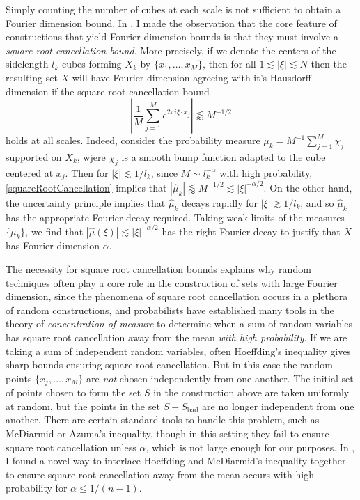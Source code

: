 \documentclass[11pt]{article}
\begin{document}
Simply counting the number of cubes at each scale is not sufficient to obtain a Fourier dimension bound. In \cite{DensonFourier}, I made the observation that the core feature of constructions that yield Fourier dimension bounds is that they must involve a \emph{square root cancellation bound}. More precisely, if we denote the centers of the sidelength $l_k$ cubes forming $X_k$ by $\{ x_1,\dots,x_M \}$, then for all $1 \lesssim |\xi| \lesssim N$ then the resulting set $X$ will have Fourier dimension agreeing with it's Hausdorff dimension if the square root cancellation bound
%
\begin{equation} \label{squareRootCancellation}
	\left| \frac{1}{M} \sum_{j = 1}^M e^{2 \pi i \xi \cdot x_j} \right| \lessapprox M^{-1/2}
\end{equation}
%
holds at all scales. Indeed, consider the probability measure $\mu_k = M^{-1} \sum_{j = 1}^M \chi_j$ supported on $X_k$, wjere $\chi_j$ is a smooth bump function adapted to the cube centered at $x_j$. Then for $|\xi| \lesssim 1/l_k$, since $M \sim l_k^{-\alpha}$ with high probability, \eqref{squareRootCancellation} implies that $|\widehat{\mu}_k| \lessapprox M^{-1/2} \lesssim |\xi|^{-\alpha/2}$. On the other hand, the uncertainty principle implies that $\widehat{\mu}_k$ decays rapidly for $|\xi| \gtrsim 1/l_k$, and so $\widehat{\mu}_k$ has the appropriate Fourier decay required. Taking weak limits of the measures $\{ \mu_k \}$, we find that $|\widehat{\mu}(\xi)| \lesssim |\xi|^{-\alpha/2}$ has the right Fourier decay to justify that $X$ has Fourier dimension $\alpha$.

The necessity for square root cancellation bounds explains why random techniques often play a core role in the construction of sets with large Fourier dimension, since the phenomena of square root cancellation occurs in a plethora of random constructions, and probabilists have established many tools in the theory of \emph{concentration of measure} to determine when a sum of random variables has square root cancellation away from the mean \emph{with high probability}. If we are taking a sum of independent random variables, often Hoeffding's inequality gives sharp bounds ensuring square root cancellation. But in this case the random points $\{ x_j, \dots, x_M \}$ are \emph{not} chosen independently from one another. The initial set of points chosen to form the set $S$ in the construction above are taken uniformly at random, but the points in the set $S - S_{\text{bad}}$ are no longer independent from one another. There are certain standard tools to handle this problem, such as McDiarmid or Azuma's inequality, though in this setting they fail to ensure square root cancellation unless $\alpha$, which is not large enough for our purposes. In \cite{DensonFourier}, I found a novel way to interlace Hoeffding and McDiarmid's inequality together to ensure square root cancellation away from the mean occurs with high probability for $\alpha \leq 1/(n-1)$.
\end{document}
